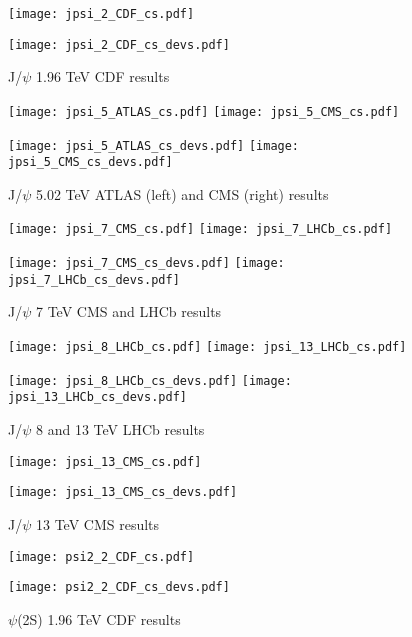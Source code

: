 \documentclass{article}
\begin{document}

\begin{figure}
\centering
\texttt{[image: jpsi\_2\_CDF\_cs.pdf]}

\texttt{[image: jpsi\_2\_CDF\_cs\_devs.pdf]}
\caption{J/$\psi$ 1.96 TeV CDF results}
\end{figure}

\clearpage

\begin{figure}
\centering
\texttt{[image: jpsi\_5\_ATLAS\_cs.pdf]}
\texttt{[image: jpsi\_5\_CMS\_cs.pdf]}

\texttt{[image: jpsi\_5\_ATLAS\_cs\_devs.pdf]}
\texttt{[image: jpsi\_5\_CMS\_cs\_devs.pdf]}
\caption{J/$\psi$ 5.02 TeV ATLAS (left) and CMS (right) results}
\end{figure}

\clearpage

\begin{figure}
\centering
\texttt{[image: jpsi\_7\_CMS\_cs.pdf]}
\texttt{[image: jpsi\_7\_LHCb\_cs.pdf]}

\texttt{[image: jpsi\_7\_CMS\_cs\_devs.pdf]}
\texttt{[image: jpsi\_7\_LHCb\_cs\_devs.pdf]}
\caption{J/$\psi$ 7 TeV CMS and LHCb results}
\end{figure}

\clearpage

\begin{figure}
\centering
\texttt{[image: jpsi\_8\_LHCb\_cs.pdf]}
\texttt{[image: jpsi\_13\_LHCb\_cs.pdf]}

\texttt{[image: jpsi\_8\_LHCb\_cs\_devs.pdf]}
\texttt{[image: jpsi\_13\_LHCb\_cs\_devs.pdf]}
\caption{J/$\psi$ 8 and 13 TeV LHCb results}
\end{figure}

\clearpage

\begin{figure}
\centering
\texttt{[image: jpsi\_13\_CMS\_cs.pdf]}

\texttt{[image: jpsi\_13\_CMS\_cs\_devs.pdf]}
\caption{J/$\psi$ 13 TeV CMS results}
\end{figure}

\clearpage

\begin{figure}
\centering
\texttt{[image: psi2\_2\_CDF\_cs.pdf]}

\texttt{[image: psi2\_2\_CDF\_cs\_devs.pdf]}
\caption{$\psi$(2S) 1.96 TeV CDF results}
\end{figure}
\end{document}
